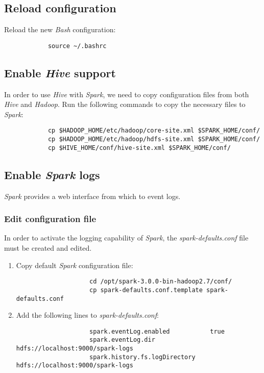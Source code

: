 \documentclass{article}
\begin{document}
        \subsection{Reload configuration}
        Reload the new \emph{Bash} configuration:
        \begin{verbatim}
            source ~/.bashrc
        \end{verbatim}

        \subsection{Enable \emph{Hive} support}
        In order to use \emph{Hive} with \emph{Spark}, we need to copy configuration files from both
        \emph{Hive} and \emph{Hadoop}. Run the following commands to copy the necessary files to \emph{Spark}:
        \begin{verbatim}
            cp $HADOOP_HOME/etc/hadoop/core-site.xml $SPARK_HOME/conf/
            cp $HADOOP_HOME/etc/hadoop/hdfs-site.xml $SPARK_HOME/conf/
            cp $HIVE_HOME/conf/hive-site.xml $SPARK_HOME/conf/
        \end{verbatim}

        \subsection{Enable \emph{Spark} logs}
        \emph{Spark} provides a web interface from which to event logs.
            \subsubsection{Edit configuration file}
            In order to activate the logging capability of \emph{Spark}, the \emph{spark-defaults.conf}
            file must be created and edited.
            \begin{enumerate}
                \item Copy default \emph{Spark} configuration file:
                \begin{verbatim}
                    cd /opt/spark-3.0.0-bin-hadoop2.7/conf/
                    cp spark-defaults.conf.template spark-defaults.conf
                \end{verbatim}

                \item Add the following lines to \emph{spark-defaults.conf}:
                \begin{verbatim}
                    spark.eventLog.enabled           true
                    spark.eventLog.dir               hdfs://localhost:9000/spark-logs
                    spark.history.fs.logDirectory    hdfs://localhost:9000/spark-logs
                \end{verbatim}
            \end{enumerate}
\end{document}
